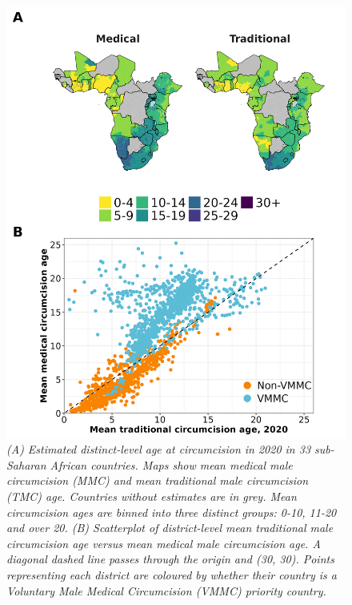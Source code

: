 \documentclass{article}
\begin{document}
\begin{figure}[H]
    \centering
    \includegraphics[width=.9\linewidth]
    {plots/05_map_plot_mean_circ_age.png}
    \caption{\emph{(A) Estimated distinct-level age at circumcision in 2020 in 33 sub-Saharan African countries. Maps show mean medical male circumcision (MMC) and mean traditional male circumcision (TMC) age. Countries without estimates are in grey. Mean circumcision ages are binned into three distinct groups: 0-10, 11-20 and over 20. (B) Scatterplot of district-level mean traditional male circumcision age versus mean medical male circumcision age. A diagonal dashed line passes through the origin and (30, 30). Points representing each district are coloured by whether their country is a Voluntary Male Medical Circumcision (VMMC) priority country.}}
\end{figure}

\end{document}
